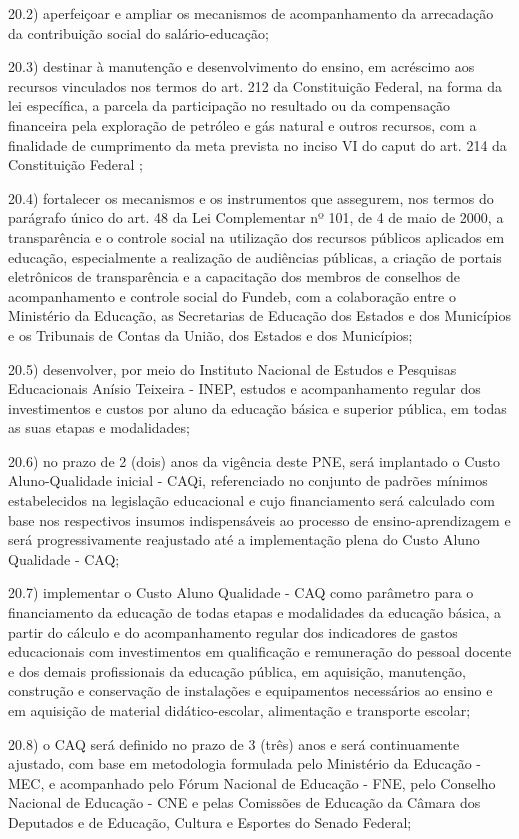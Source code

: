 \documentclass[
]{book}
\begin{document}
20.2) aperfeiçoar e ampliar os mecanismos de acompanhamento da arrecadação da contribuição social do salário-educação;

20.3) destinar à manutenção e desenvolvimento do ensino, em acréscimo aos recursos vinculados nos termos do art. 212 da Constituição Federal, na forma da lei específica, a parcela da participação no resultado ou da compensação financeira pela exploração de petróleo e gás natural e outros recursos, com a finalidade de cumprimento da meta prevista no inciso VI do caput do art. 214 da Constituição Federal ;

20.4) fortalecer os mecanismos e os instrumentos que assegurem, nos termos do parágrafo único do art. 48 da Lei Complementar nº 101, de 4 de maio de 2000, a transparência e o controle social na utilização dos recursos públicos aplicados em educação, especialmente a realização de audiências públicas, a criação de portais eletrônicos de transparência e a capacitação dos membros de conselhos de acompanhamento e controle social do Fundeb, com a colaboração entre o Ministério da Educação, as Secretarias de Educação dos Estados e dos Municípios e os Tribunais de Contas da União, dos Estados e dos Municípios;

20.5) desenvolver, por meio do Instituto Nacional de Estudos e Pesquisas Educacionais Anísio Teixeira - INEP, estudos e acompanhamento regular dos investimentos e custos por aluno da educação básica e superior pública, em todas as suas etapas e modalidades;

20.6) no prazo de 2 (dois) anos da vigência deste PNE, será implantado o Custo Aluno-Qualidade inicial - CAQi, referenciado no conjunto de padrões mínimos estabelecidos na legislação educacional e cujo financiamento será calculado com base nos respectivos insumos indispensáveis ao processo de ensino-aprendizagem e será progressivamente reajustado até a implementação plena do Custo Aluno Qualidade - CAQ;

20.7) implementar o Custo Aluno Qualidade - CAQ como parâmetro para o financiamento da educação de todas etapas e modalidades da educação básica, a partir do cálculo e do acompanhamento regular dos indicadores de gastos educacionais com investimentos em qualificação e remuneração do pessoal docente e dos demais profissionais da educação pública, em aquisição, manutenção, construção e conservação de instalações e equipamentos necessários ao ensino e em aquisição de material didático-escolar, alimentação e transporte escolar;

20.8) o CAQ será definido no prazo de 3 (três) anos e será continuamente ajustado, com base em metodologia formulada pelo Ministério da Educação - MEC, e acompanhado pelo Fórum Nacional de Educação - FNE, pelo Conselho Nacional de Educação - CNE e pelas Comissões de Educação da Câmara dos Deputados e de Educação, Cultura e Esportes do Senado Federal;
\end{document}
